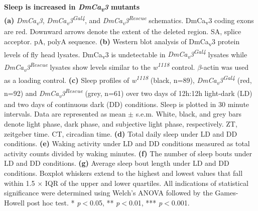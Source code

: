 \label{fig:3}
\textbf{Sleep is increased in \emph{DmCa\textsubscript{v}3} mutants}
\\
\textbf{(a)} \emph{DmCa\textsubscript{v}3}, \emph{DmCa\textsubscript{v}3\textsuperscript{Gal4}}, and \emph{DmCa\textsubscript{v}3\textsuperscript{Rescue}} schematics. 
DmCa\textsubscript{v}3 coding exons are red.
Downward arrows denote the extent of the deleted region.
SA, splice acceptor.
pA, polyA sequence.  
\textbf{(b)} Western blot analysis of DmCa\textsubscript{v}3 protein levels of fly head lysates.
DmCa\textsubscript{v}3 is undetectable in \emph{DmCa\textsubscript{v}3\textsuperscript{Gal4}} lysates while \emph{DmCa\textsubscript{v}3\textsuperscript{Rescue}} lysates show levels similar to the \emph{w\textsuperscript{1118}} control.
$\beta$-actin was used as a loading control.
\textbf{(c)} Sleep profiles of \emph{w\textsuperscript{1118}} (black, n=89), \emph{DmCa\textsubscript{v}3\textsuperscript{Gal4}} (red, n=92) and \emph{DmCa\textsubscript{v}3\textsuperscript{Rescue}}  (grey, n=61) over two days of 12h:12h light-dark (LD) and two days of continuous dark (DD) conditions.
Sleep is plotted in 30 minute intervals.
Data are represented as mean $\pm$ s.e.m.
White, black, and grey bars denote light phase, dark phase, and subjective light phase, respectively.
ZT, zeitgeber time.
CT, circadian time.
\textbf{(d)} Total daily sleep under LD and DD conditions.
\textbf{(e)} Waking activity under LD and DD conditions measured as total activity counts divided by waking minutes.
\textbf{(f)} The number of sleep bouts under LD and DD conditions.
\textbf{(g)} Average sleep bout length under LD and DD conditions.
Boxplot whiskers extend to the highest and lowest values that fall within 1.5 $\times$ IQR of the upper and lower quartiles.
All indications of statistical significance were determined using Welch's ANOVA followed by the Games-Howell post hoc test.
* \emph{p}$<$0.05, ** \emph{p}$<$0.01, *** \emph{p}$<$0.001.

  
  
